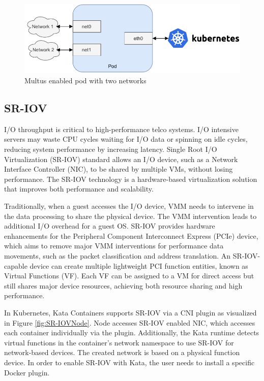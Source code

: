 \begin{figure}[ht]
  \begin{center}
    \includegraphics[width=13.5cm]{images/Multus.pdf}
    \caption{Multus enabled pod with two networks}
    \label{fig:Multus}
  \end{center}
\end{figure}

\subsection{SR-IOV}
\label{section:SR-IOV}

I/O throughput is critical to high-performance telco systems. I/O intensive servers may waste CPU cycles waiting for I/O data or spinning on idle cycles, reducing system performance by increasing latency. Single Root I/O Virtualization (SR-IOV) standard allows an I/O device, such as a Network Interface Controller (NIC), to be shared by multiple VMs, without losing performance. The SR-IOV technology is a hardware-based virtualization solution that improves both performance and scalability. \cite{Dong2012}

Traditionally, when a guest accesses the I/O device, VMM needs to intervene in the data processing to share the physical device. The VMM intervention leads to additional I/O overhead for a guest OS. SR-IOV provides hardware enhancements for the Peripheral Component Interconnect Express (PCIe) device, which aims to remove major VMM interventions for performance data movements, such as the packet classification and address translation. An SR-IOV-capable device can create multiple lightweight PCI function entities, known as Virtual Functions (VF). Each VF can be assigned to a VM for direct access but still shares major device resources, achieving both resource sharing and high performance. \cite{Dong2012}

In Kubernetes, Kata Containers supports SR-IOV via a CNI plugin \cite{SR-IOVOpenShift} as visualized in Figure \ref{fig:SR-IOVNode}. Node accesses SR-IOV enabled NIC, which accesses each container individually via the plugin. Additionally, the Kata runtime detects virtual functions in the container's network namespace to use SR-IOV for network-based devices. The created network is based on a physical function device. In order to enable SR-IOV with Kata, the user needs to install a specific Docker plugin. \cite{SR-IOVKataContainers}

